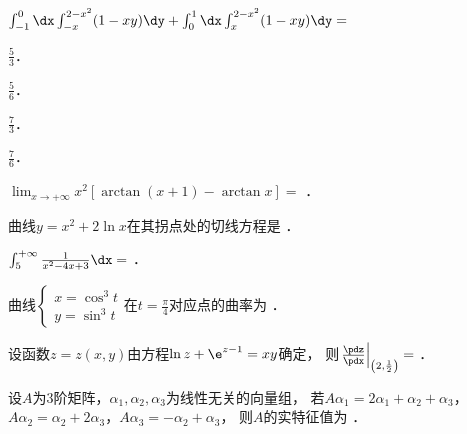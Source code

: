 \documentclass[plain,noanswer,medmath]{../../template/jnuexam}
\begin{document}


\begin{problem}
$\int_{-1}^0\dx \int_{-x}^{2 - x^2}(1 - xy)\dy + \int_0^1\dx \int_x^{2 - x^2}(1 - xy)\dy =$\pickout{}
\begin{abcd}
\item $\frac{5}{3}$．
\item $\frac{5}{6}$．
\item $\frac{7}{3}$．
\item $\frac{7}{6}$．
\end{abcd}
\end{problem}








\begin{problem}
$\lim_{x \to +\infty} x^2[\arctan(x + 1) - \arctan x] =$ \fillin{}．
\end{problem}


\begin{problem}
曲线$y = x^2 + 2\ln x$在其拐点处的切线方程是 \fillin{}．
\end{problem}


\begin{problem}
$\int_5^{+\infty} \frac{1}{x^2 - 4x + 3}\dx =$ \fillin{}．
\end{problem}


\begin{problem}
曲线$\begin{cases}
  x = \cos^3 t \\
  y = \sin^3 t
\end{cases}$在$t = \frac{\pi}{4}$对应点的曲率为 \fillin{}．
\end{problem}


\begin{problem}
设函数$z = z(x,y)$由方程$\ln z + \e^{z - 1} = xy$确定，
则$\left.\frac{\pdz}{\pdx}\right|_{\left(2,\frac{1}{2}\right)} =$ \fillin{}．
\end{problem}


\begin{problem}
设$A$为$3$阶矩阵，$\alpha_1,\alpha_2,\alpha_3$为线性无关的向量组，
若$A\alpha_1 = 2\alpha_1 + \alpha_2 + \alpha_3$，
$A\alpha_2 = \alpha_2 + 2\alpha_3$，$A\alpha_3 = - \alpha_2 + \alpha_3$，
则$A$的实特征值为 \fillin{}．
\end{problem}
\end{document}
